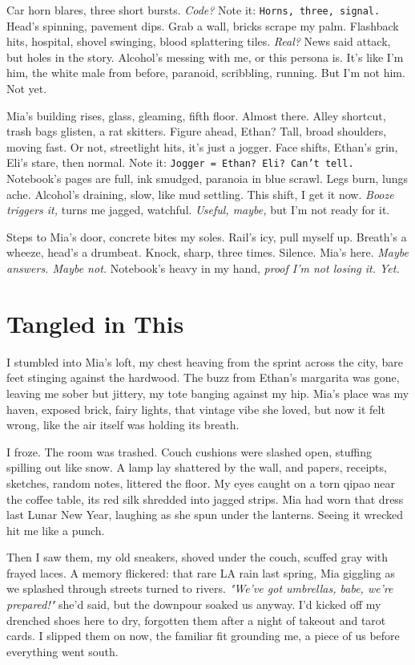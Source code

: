 \documentclass[12pt,oneside]{book}
\newcommand{\note}[1]{\texttt{#1}}
\begin{document}
Car horn blares, three short bursts. \textit{Code?} Note it: \note{Horns, three, signal.} Head’s spinning, pavement dips. Grab a wall, bricks scrape my palm. Flashback hits, hospital, shovel swinging, blood splattering tiles. \textit{Real?} News said attack, but holes in the story. Alcohol’s messing with me, or this persona is. It’s like I’m him, the white male from before, paranoid, scribbling, running. But I’m not him. Not yet.

Mia’s building rises, glass, gleaming, fifth floor. Almost there. Alley shortcut, trash bags glisten, a rat skitters. Figure ahead, Ethan? Tall, broad shoulders, moving fast. Or not, streetlight hits, it’s just a jogger. Face shifts, Ethan’s grin, \textnormal{Eli}’s stare, then normal. Note it: \note{Jogger = Ethan? Eli? Can’t tell.} Notebook’s pages are full, ink smudged, paranoia in blue scrawl. Legs burn, lungs ache. Alcohol’s draining, slow, like mud settling. This shift, I get it now. \textit{Booze triggers it,} turns me jagged, watchful. \textit{Useful, maybe,} but I’m not ready for it.

Steps to Mia’s door, concrete bites my soles. Rail’s icy, pull myself up. Breath’s a wheeze, head’s a drumbeat. Knock, sharp, three times. Silence. Mia’s here. \textit{Maybe answers. Maybe not.} Notebook’s heavy in my hand, \textit{proof I’m not losing it. Yet.}

\chapter{Tangled in This}

I stumbled into Mia’s loft, my chest heaving from the sprint across the city, bare feet stinging against the hardwood. The buzz from Ethan’s margarita was gone, leaving me sober but jittery, my tote banging against my hip. Mia’s place was my haven, exposed brick, fairy lights, that vintage vibe she loved, but now it felt wrong, like the air itself was holding its breath.

I froze. The room was trashed. Couch cushions were slashed open, stuffing spilling out like snow. A lamp lay shattered by the wall, and papers, receipts, sketches, random notes, littered the floor. My eyes caught on a torn qipao near the coffee table, its red silk shredded into jagged strips. Mia had worn that dress last Lunar New Year, laughing as she spun under the lanterns. Seeing it wrecked hit me like a punch.

Then I saw them, my old sneakers, shoved under the couch, scuffed gray with frayed laces. A memory flickered: that rare LA rain last spring, Mia giggling as we splashed through streets turned to rivers. \textit{"We’ve got umbrellas, babe, we’re prepared!"} she’d said, but the downpour soaked us anyway. I’d kicked off my drenched shoes here to dry, forgotten them after a night of takeout and tarot cards. I slipped them on now, the familiar fit grounding me, a piece of us before everything went south.
\end{document}
